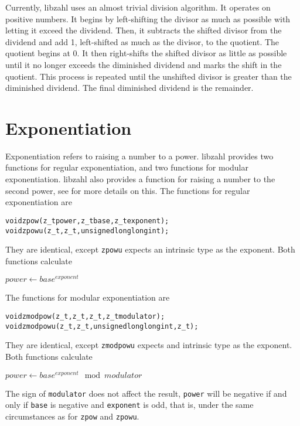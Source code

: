 Currently, libzahl uses an almost trivial division
algorithm. It operates on positive numbers. It begins
by left-shifting the divisor as much as possible with
letting it exceed the dividend. Then, it subtracts
the shifted divisor from the dividend and add 1,
left-shifted as much as the divisor, to the quotient.
The quotient begins at 0. It then right-shifts
the shifted divisor as little as possible until
it no longer exceeds the diminished dividend and
marks the shift in the quotient. This process is
repeated until the unshifted divisor is greater
than the diminished dividend. The final diminished
dividend is the remainder.



\newpage
\section{Exponentiation}
\label{sec:Exponentiation}

Exponentiation refers to raising a number to
a power. libzahl provides two functions for
regular exponentiation, and two functions for
modular exponentiation. libzahl also provides
a function for raising a number to the second
power, see  for
more details on this. The functions for regular
exponentiation are

\begin{alltt}
   void zpow(z_t power, z_t base, z_t exponent);
   void zpowu(z_t, z_t, unsigned long long int);
\end{alltt}

\noindent
They are identical, except {\tt zpowu} expects
an intrinsic type as the exponent. Both functions
calculate

\vspace{1em}
$power \gets base^{exponent}$
\vspace{1em}

\noindent
The functions for modular exponentiation are
\begin{alltt}
   void zmodpow(z_t, z_t, z_t, z_t modulator);
   void zmodpowu(z_t, z_t, unsigned long long int, z_t);
\end{alltt}

\noindent
They are identical, except {\tt zmodpowu} expects
and intrinsic type as the exponent. Both functions
calculate

\vspace{1em}
$power \gets base^{exponent} \mod modulator$
\vspace{1em}

The sign of {\tt modulator} does not affect the
result, {\tt power} will be negative if and only
if {\tt base} is negative and {\tt exponent} is
odd, that is, under the same circumstances as for
{\tt zpow} and {\tt zpowu}.

